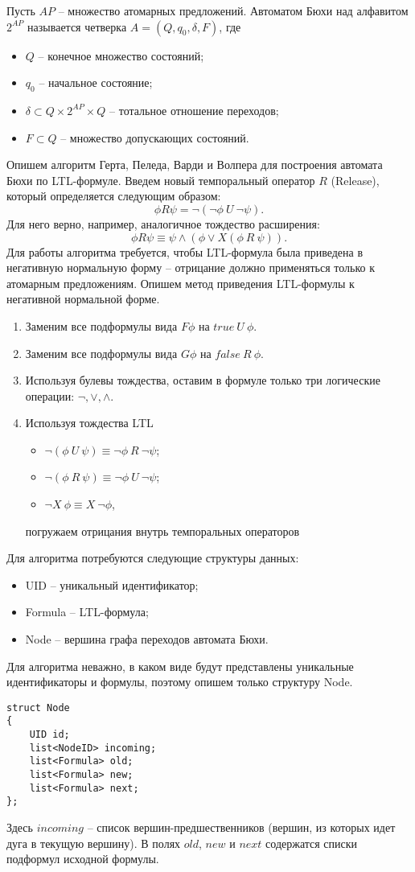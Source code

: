 \documentclass[a4paper,12pt]{article}
\begin{document}
Пусть $AP$ -- множество атомарных предложений. Автоматом Бюхи
над алфавитом $2^{AP}$ называется четверка $A = (Q, q_0, \delta, F)$, где
\begin{itemize}
    \item $Q$ -- конечное множество состояний;
    \item $q_0$ -- начальное состояние;
    \item $\delta \subset Q \times 2^{AP} \times Q$ -- тотальное отношение переходов;
    \item $F \subset Q$ -- множество допускающих состояний.
\end{itemize}
Опишем алгоритм Герта, Пеледа, Варди и Волпера для
построения автомата Бюхи по LTL-формуле. Введем новый
темпоральный оператор $R$ (Release), который определяется
следующим образом:
$$\phi R \psi = \lnot(\lnot \phi\ U\ \lnot \psi).$$
Для него верно, например, аналогичное тождество расширения:
$$\phi R \psi \equiv \psi \wedge (\phi \vee X(\phi\ R\ \psi)).$$
Для работы алгоритма требуется, чтобы LTL-формула была приведена
в негативную нормальную форму -- отрицание должно применяться
только к атомарным предложениям.
Опишем метод приведения LTL-формулы к негативной нормальной
форме.
\begin{enumerate}
    \item Заменим все подформулы вида $F \phi$ на $true\ U\ \phi$.
    \item Заменим все подформулы вида $G \phi$ на $false\ R\ \phi$.
    \item Используя булевы тождества, оставим в формуле только три логические операции: $\lnot, \vee, \wedge$.
    \item Используя тождества LTL
    \begin{itemize}
        \item $\lnot (\phi\ U\ \psi) \equiv \lnot \phi\ R\ \lnot \psi$;
        \item $\lnot (\phi\ R\ \psi) \equiv \lnot \phi\ U\ \lnot \psi$;
        \item $\lnot X\ \phi \equiv X\ \lnot \phi$,
    \end{itemize}
    погружаем отрицания внутрь темпоральных операторов
\end{enumerate}
Для алгоритма потребуются следующие структуры данных:
\begin{itemize}
    \item UID – уникальный идентификатор;
    \item Formula – LTL-формула;
    \item Node – вершина графа переходов автомата Бюхи.
\end{itemize}
Для алгоритма неважно, в каком виде будут представлены
уникальные идентификаторы и формулы, поэтому опишем только
структуру Node.
\lstset{
    language=C,
    basicstyle=\small\ttfamily,
    frame=single,
    captionpos=b
}
\begin{lstlisting}
struct Node
{
    UID id;
    list<NodeID> incoming;
    list<Formula> old;
    list<Formula> new;
    list<Formula> next;
};
\end{lstlisting}
Здесь $incoming$ – список вершин-предшественников (вершин, из
которых идет дуга в текущую вершину). В полях $old$, $new$ и $next$
содержатся списки подформул исходной формулы.
\end{document}
